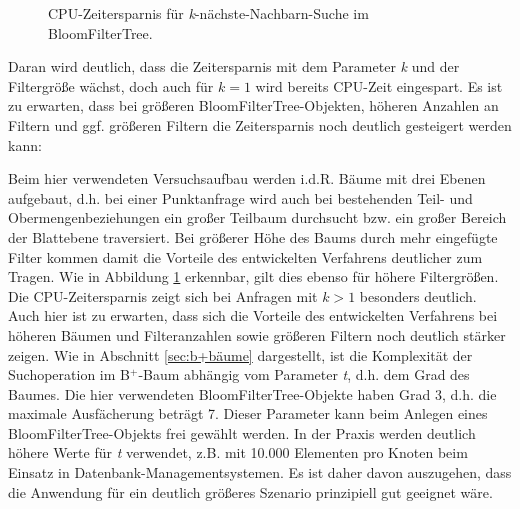\begin{figure}[hpbt]
 \caption[CPU-Zeitersparnis für \textit{k}-nächste-Nachbarn-Suche im BloomFilterTree.]{CPU-Zeitersparnis für \textit{k}-nächste-Nachbarn-Suche im BloomFilterTree.}
 \label{fig:multipic1} %
\end{figure}
Daran wird deutlich, dass die Zeitersparnis mit dem Parameter \textit{k} und der Filtergröße wächst, doch auch für $k=1$ wird bereits CPU-Zeit eingespart. Es ist zu erwarten, dass bei größeren BloomFilterTree-Objekten, höheren Anzahlen an Filtern und ggf. größeren Filtern die Zeitersparnis noch deutlich gesteigert werden kann: 

Beim hier verwendeten Versuchsaufbau werden i.d.R. Bäume mit drei Ebenen aufgebaut, d.h. bei einer Punktanfrage wird auch bei bestehenden Teil- und Obermengenbeziehungen ein großer Teilbaum durchsucht bzw. ein großer Bereich der Blattebene traversiert. Bei größerer Höhe des Baums durch mehr eingefügte Filter kommen damit die Vorteile des entwickelten Verfahrens deutlicher zum Tragen. Wie in Abbildung \ref{fig:multipic1} erkennbar, gilt dies ebenso für höhere Filtergrößen. Die CPU-Zeitersparnis zeigt sich bei Anfragen mit $k>1$ besonders deutlich. Auch hier ist zu erwarten, dass sich die Vorteile des entwickelten Verfahrens bei höheren Bäumen und Filteranzahlen sowie größeren Filtern noch deutlich stärker zeigen.
\newpage
\noindent
Wie in Abschnitt \ref{sec:b+bäume} dargestellt, ist die Komplexität der Suchoperation im B$^+$-Baum abhängig vom Parameter \textit{t}, d.h. dem Grad des Baumes. Die hier verwendeten Bloom\-Filter\-Tree-Objekte haben Grad 3, d.h. die maximale Ausfächerung beträgt 7. Dieser Parameter kann beim Anlegen eines BloomFilterTree-Objekts frei gewählt werden. In der Praxis werden deutlich höhere Werte für \textit{t} verwendet, z.B. mit 10.000 Elementen pro Knoten beim Einsatz in Datenbank-Managementsystemen. Es ist daher davon auszugehen, dass die Anwendung für ein deutlich größeres Szenario prinzipiell gut geeignet wäre.  
